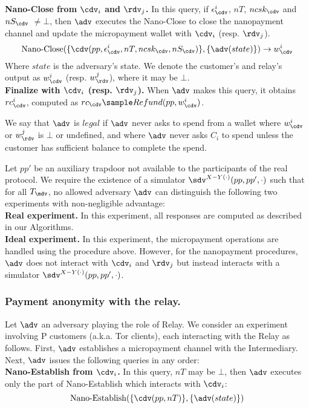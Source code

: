 \textbf{Nano-Close from $\cdv_i$ and $\rdv_j$.} In this query, if $\epsilon^i_\cdv$, $nT$, $ncsk_\cdv$ and $nS_\cdv$ $\neq \bot$, then $\adv$ executes the Nano-Close to close the nanopayment channel and update the micropayment wallet with $\cdv_i$ (resp. $\rdv_j$).
$$\operatorname{Nano-Close}(\{\cdv(pp, \epsilon^i_\cdv, nT, ncsk_\cdv, nS_\cdv)\}, \{\adv(state)\}) \rightarrow w^i_\cdv$$
Where $state$ is the adversary's state. We denote the customer's and relay's output as $w^i_\cdv$ (resp. $w^j_\rdv$), where it may be $\bot$.\\

\textbf{Finalize with $\cdv_i$ (resp. $\rdv_j$).} When $\adv$ makes this query, it obtains $rc^i_\cdv$, computed as $rc_\cdv \sample Refund(pp, w^i_\cdv)$.

We say that $\adv$ is $legal$ if $\adv$ never asks to spend from a wallet where $w^i_\cdv$ or $w^j_\rdv$ is $\bot$ or undefined, and where $\adv$ never asks $C_i$ to spend unless the customer has sufficient balance to complete the spend.

Let $pp'$ be an auxiliary trapdoor not available to the participants of the real protocol. We require the existence of a simulator $\sdv^{X-Y(\cdot)}(pp, pp', \cdot)$ such that for all $T_\mdv$, no allowed adversary $\adv$ can distinguish the following two experiments with non-negligible advantage:\\
\textbf{Real experiment.} In this experiment, all responses are computed as described in our Algorithms.\\
\textbf{Ideal experiment.} In this experiment, the micropayment operations are handled using the procedure above. However, for the nanopayment procedures, $\adv$ does not interact with $\cdv_i$ and $\rdv_j$ but instead interacts with a simulator $\sdv^{X-Y(\cdot)}(pp,pp',\cdot)$.

\subsubsection{Payment anonymity with the relay.}
\label{def:anon2}

Let $\adv$ an adversary playing the role of Relay. We consider an experiment involving P customers (a.k.a. Tor clients), each interacting with the Relay as follows. First, $\adv$ establishes a micropayment channel with the Intermediary. Next, $\adv$ issues the following queries in any order:\\

\textbf{Nano-Establish from $\cdv_i$.} In this query, $nT$ may be $\bot$, then $\adv$ executes only the part of Nano-Establish which interacts with $\cdv_i$:
$$\operatorname{Nano-Establish}(\{\cdv(pp, nT)\}, \{\adv(state)\})$$

